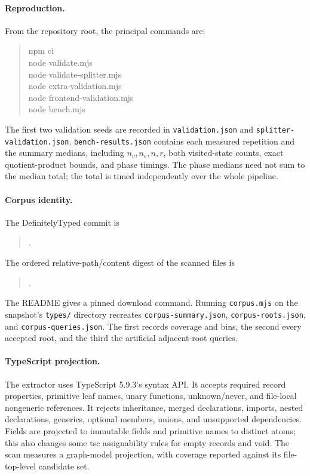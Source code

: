 \documentclass[11pt,letterpaper]{article}
\theoremstyle{definition}\newtheorem{definition}[theorem]{Definition}
\begin{document}
\paragraph{Reproduction.}
From the repository root, the principal commands are:
\begin{quote}\ttfamily
npm ci\\
node validate.mjs\\
node validate-splitter.mjs\\
node extra-validation.mjs\\
node frontend-validation.mjs\\
node bench.mjs
\end{quote}
The first two validation seeds are recorded in \texttt{validation.json} and \texttt{splitter-validation.json}. \texttt{bench-results.json} contains each measured repetition and the summary medians, including $n_v,n_e,n,r$, both visited-state counts, exact quotient-product bounds, and phase timings. The phase medians need not sum to the median total; the total is timed independently over the whole pipeline.

\paragraph{Corpus identity.}
The DefinitelyTyped commit is
\begin{quote}\ttfamily{}.\end{quote}
The ordered relative-path/content digest of the scanned files is
\begin{quote}\ttfamily{}.\end{quote}
The README gives a pinned download command. Running \texttt{corpus.mjs} on the snapshot's \texttt{types/} directory recreates \texttt{corpus-summary.json}, \texttt{corpus-roots.json}, and \texttt{corpus-queries.json}. The first records coverage and bins, the second every accepted root, and the third the artificial adjacent-root queries.

\paragraph{TypeScript projection.}
The extractor uses TypeScript 5.9.3's syntax API. It accepts required record properties, primitive leaf names, unary functions, unknown/never, and file-local nongeneric references. It rejects inheritance, merged declarations, imports, nested declarations, generics, optional members, unions, and unsupported dependencies. Fields are projected to immutable fields and primitive names to distinct atoms; this also changes some tsc assignability rules for empty records and void. The scan measures a graph-model projection, with coverage reported against its file-top-level candidate set.
\end{document}
